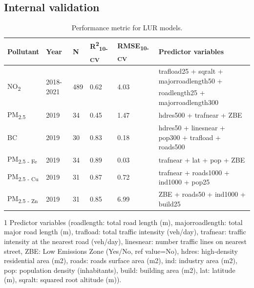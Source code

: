\documentclass{article}
\begin{document}
\subsection{Internal validation}
\begin{table}[ht]
\centering
\begin{threeparttable}
\caption{Performance metric for LUR models.}
\label{Table S3}
\begin{tabular}{llllll}
\toprule
\textbf{Pollutant} & \textbf{Year} & \textbf{N}  &  \textbf{R\textsuperscript{2}\textsubscript{10-CV}} & \textbf{RMSE\textsubscript{10-CV}} & \textbf{Predictor variables}\tnote{1} \\
\midrule
\multirow{2}{*}{NO\textsubscript{2}} & \multirow{2}{*}{2018-2021} & \multirow{2}{*}{489} & \multirow{2}{*}{0.62} & \multirow{2}{*}{4.03} & trafload25 + sqralt + majorroadlength50 + \\ 
 & & & & & roadlength25 + majorroadlength300 \\
\midrule
PM\textsubscript{2.5} & 2019 & 34 & 0.45 & 1.47 & hdres500 + trafnear + ZBE \\
\midrule
BC & 2019 & 30  & 0.83 & 0.18 & hdres50 + linesnear + pop300 + trafload + roads500 \\
\midrule
PM\textsubscript{2.5 - Fe} & 2019 & 34 & 0.89 & 0.03 & trafnear + lat + pop + ZBE  \\
\midrule
PM\textsubscript{2.5 - Cu} & 2019 & 31 & 0.87 & 0.72 & trafnear + roads1000 + ind1000 + pop25 \\
\midrule
PM\textsubscript{2.5 - Zn} & 2019 & 31  & 0.85 & 6.99 & ZBE + roads50 + ind1000 + build25  \\
\bottomrule
\end{tabular}
\begin{tablenotes}
\small
\item[1] Predictor variables (roadlength: total road length (m), majorroadlength: total major road length (m), trafload: total traffic intensity (veh/day), trafnear: traffic intensity at the nearest road (veh/day), linesnear: number traffic lines on nearest street, ZBE: Low Emissions Zone (Yes/No, ref value=No), hdres: high-density residential area (m2), roads: roads surface area (m2), ind: industry area (m2), pop: population density (inhabitants), build: building area (m2), lat: latitude (m), sqralt: squared root altitude (m)).
\end{tablenotes}
\end{threeparttable}
\end{table}
\end{document}
